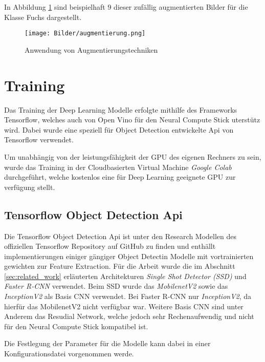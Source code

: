 In Abbildung \ref{fig:augmentierung} sind beispielhaft 9 dieser 
zufällig augmentierten Bilder für die Klasse Fuchs dargestellt.


\begin{figure}[H]
    \centering
    \label{fig:augmentierung}
    \texttt{[image: Bilder/augmentierung.png]}
    \caption{Anwendung von Augmentierungstechniken}
\end{figure}





\section{Training}

Das Training der Deep Learning Modelle erfolgte mithilfe 
des Frameworks Tensorflow, welches auch von 
Open Vino für den Neural Compute Stick uterstütz wird.
Dabei wurde eine speziell für Object Detection 
entwickelte Api von Tensorflow verwendet.

Um unabhängig von der leistungsfähigkeit der GPU des eigenen 
Rechners zu sein, wurde das Training in der Cloudbasierten Virtual 
Machine \textit{Google Colab} \cite{colab} durchgeführt, welche kostenlos eine für 
Deep Learning geeignete GPU zur verfügung stellt.



\subsection{Tensorflow Object Detection Api}



Die Tensorflow Object Detection Api ist unter den Research Modellen
\cite{tfobjdet} des offiziellen Tensorflow Repository auf GitHub zu
finden und enthällt implementierungen einiger gängiger Object Detectin
Modelle mit vortrainierten gewichten zur Feature Extraction.
Für die Arbeit wurde die im Abschnitt \ref{sec:related_work} 
erläuterten Architekturen \textit{Single Shot Detector (SSD)}
und \textit{Faster R-CNN} verwendet.
Beim SSD wurde das \textit{MobilenetV2} sowie das \textit{InceptionV2} 
als Basis CNN verwendet.
Bei Faster R-CNN nur \textit{InceptionV2}, da hierfür das MobilenetV2 
nicht verfügbar war.
Weitere Basis CNN sind unter Anderem das Resudial Network, welche jedoch 
sehr Rechenaufwendig und nicht für den Neural Compute Stick 
kompatibel ist.

Die Festlegung der Parameter für die Modelle kann dabei 
in einer Konfigurationsdatei vorgenommen werde.


